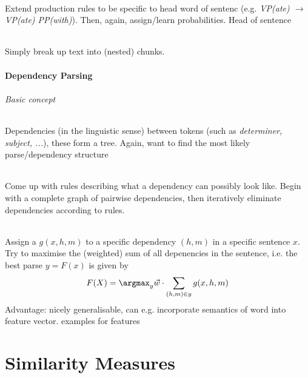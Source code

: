 \documentclass[10pt,twocolumn]{article}
\begin{document}
\paragraph{} Extend production rules to be specific to
head word of sentenc (e.g. \textit{VP(ate)  $\rightarrow$ VP(ate) PP(with)}). Then, again,
assign/learn probabilities. \todo Head of sentence

\paragraph{ } Simply break up text into (nested) chunks.

\subsection{Dependency Parsing}

\paragraph{\textit{Basic concept}} Dependencies (in the linguistic sense)
between tokens (such as \textit{determiner, subject, ...}), these form a tree.
Again, want to find the most likely parse/dependency structure

\paragraph{ } Come up with rules describing what a
dependency can possibly look like. Begin with a complete graph of pairwise
dependencies, then iteratively eliminate dependencies according to rules.

\paragraph{ } Assign a 
$g(x,h,m)$ to a specific dependency $(h,m)$ in a specific sentence $x$. Try to
maximise the (weighted) sum of all depenencies in the sentence, i.e. the best
parse $y = F(x)$ is given by
\begin{align*}
  F(X) = \argmax_y \vec w \cdot \sum_{(h,m)\in y} g(x,h,m)
\end{align*}
Advantage: nicely generalisable, can e.g. incorporate semantics of word into
feature vector.
\todo examples for features


\pagebreak
\part{Similarity Measures}
\end{document}
